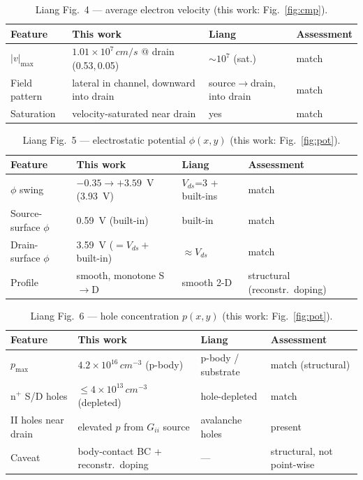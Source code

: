 \documentclass[11pt]{article}
\begin{document}
\begin{table}[h]\centering\small
\caption{Liang Fig.~4 --- average electron velocity (this work: Fig.~\ref{fig:cmp}).}\label{tab:f4}
\begin{tabular}{p{3.5cm}p{3.9cm}p{2.9cm}p{3.2cm}}
\toprule
Feature & This work & Liang & Assessment \\
\midrule
$|v|_{\max}$ & $1.01\times10^{7}\,\si{cm/s}$ @ drain (0.53,\,0.05) & $\sim\!10^{7}$ (sat.) & match \\
Field pattern & lateral in channel, downward into drain & source$\to$drain, into drain & match \\
Saturation & velocity-saturated near drain & yes & match \\
\bottomrule
\end{tabular}
\end{table}

\begin{table}[h]\centering\small
\caption{Liang Fig.~5 --- electrostatic potential $\phi(x,y)$ (this work: Fig.~\ref{fig:pot}).}\label{tab:f5}
\begin{tabular}{p{3.5cm}p{3.9cm}p{2.9cm}p{3.2cm}}
\toprule
Feature & This work & Liang & Assessment \\
\midrule
$\phi$ swing & $-0.35\to+3.59$~V (3.93~V) & $V_{ds}$=3 + built-ins & match \\
Source-surface $\phi$ & \SI{0.59}{V} (built-in) & built-in & match \\
Drain-surface $\phi$ & \SI{3.59}{V} ($=V_{ds}+$built-in) & $\approx\!V_{ds}$ & match \\
Profile & smooth, monotone S$\to$D & smooth 2-D & structural (reconstr.\ doping) \\
\bottomrule
\end{tabular}
\end{table}

\begin{table}[h]\centering\small
\caption{Liang Fig.~6 --- hole concentration $p(x,y)$ (this work: Fig.~\ref{fig:pot}).}\label{tab:f6}
\begin{tabular}{p{3.5cm}p{3.9cm}p{2.9cm}p{3.2cm}}
\toprule
Feature & This work & Liang & Assessment \\
\midrule
$p_{\max}$ & $4.2\times10^{16}\,\si{cm^{-3}}$ (p-body) & p-body / substrate & match (structural) \\
n$^+$ S/D holes & $\le\!4\times10^{13}\,\si{cm^{-3}}$ (depleted) & hole-depleted & match \\
II holes near drain & elevated $p$ from $G_{ii}$ source & avalanche holes & present \\
Caveat & body-contact BC + reconstr.\ doping & --- & structural, not point-wise \\
\bottomrule
\end{tabular}
\end{table}
\end{document}
